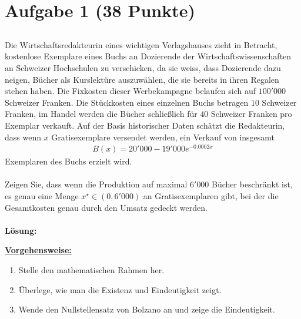 \vspace{1cm}
\renewcommand{\labelenumi}{\theenumi.}
\section*{Aufgabe 1 (38 Punkte)}
\vspace{0.4cm}
\subsection*{} 
Die Wirtschaftsredakteurin eines wichtigen Verlagshauses zieht in Betracht,
kostenlose Exemplare eines Buchs an Dozierende der Wirtschaftswissenschaften an Schweizer Hochschulen zu verschicken, da sie weiss, dass Dozierende dazu neigen, Bücher als Kurslektüre auszuwählen, die sie bereits in ihren Regalen stehen haben. Die Fixkosten dieser Werbekampagne belaufen sich auf $100'000$ Schweizer Franken.
Die Stückkosten eines einzelnen Buchs betragen $10$ Schweizer Franken, im Handel werden die Bücher schließlich für $40$ Schweizer Franken pro Exemplar verkauft.
Auf der Basis historischer Daten schätzt die Redakteurin, dass wenn $x$ Gratisexemplare versendet werden, ein Verkauf von insgesamt
\begin{align*}
	B(x) = 20'000 - 19'000 e^{-0.0002 x }
\end{align*}
Exemplaren des Buchs erzielt wird. \\
\\
Zeigen Sie, dass wenn die Produktion auf maximal $6'000$ Bücher beschränkt ist, es genau eine Menge $ x^\star \in (0, 6'000)$ an Gratisexemplaren gibt, bei der die Gesamtkosten genau durch den Umsatz gedeckt werden.
\
\\ \\
\textbf{Lösung:}
\begin{mdframed}
\underline{\textbf{Vorgehensweise:}}
\renewcommand{\labelenumi}{\theenumi.}
\begin{enumerate}
\item 
Stelle den mathematischen Rahmen her.
\item
Überlege, wie man die Existenz und Eindeutigkeit zeigt.
\item
Wende den Nullstellensatz von Bolzano an und zeige die Eindeutigkeit. 

\end{enumerate}
\end{mdframed}
